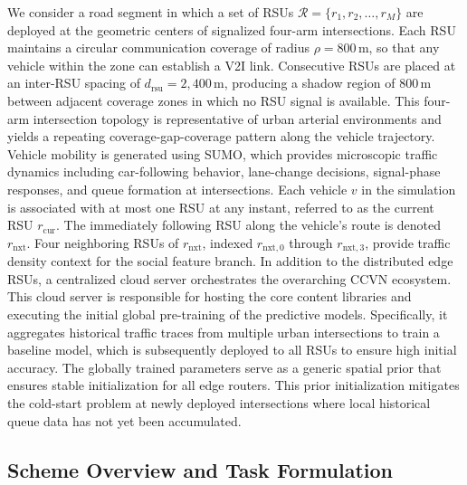 \documentclass[journal]{IEEEtran}
\begin{document}
We consider a road segment in which a set of RSUs $\mathcal{R} = \{r_1, r_2, \ldots, r_M\}$ are deployed at the geometric centers of signalized four-arm intersections.
Each RSU maintains a circular communication coverage of radius $\rho = 800\,\text{m}$, so that any vehicle within the zone can establish a V2I link.
Consecutive RSUs are placed at an inter-RSU spacing of $d_{\text{rsu}} = 2{,}400\,\text{m}$, producing a shadow region of $800\,\text{m}$ between adjacent coverage zones in which no RSU signal is available.
This four-arm intersection topology is representative of urban arterial environments and yields a repeating coverage-gap-coverage pattern along the vehicle trajectory.
Vehicle mobility is generated using SUMO, which provides microscopic traffic dynamics including car-following behavior, lane-change decisions, signal-phase responses, and queue formation at intersections.
Each vehicle $v$ in the simulation is associated with at most one RSU at any instant, referred to as the current RSU $r_{\text{cur}}$. The immediately following RSU along the vehicle's route is denoted $r_{\text{nxt}}$.
Four neighboring RSUs of $r_{\text{nxt}}$, indexed $r_{\text{nxt},0}$ through $r_{\text{nxt},3}$, provide traffic density context for the social feature branch.
In addition to the distributed edge RSUs, a centralized cloud server orchestrates the overarching CCVN ecosystem.
This cloud server is responsible for hosting the core content libraries and executing the initial global pre-training of the predictive models.
Specifically, it aggregates historical traffic traces from multiple urban intersections to train a baseline model, which is subsequently deployed to all RSUs to ensure high initial accuracy. The globally trained parameters serve as a generic spatial prior that ensures stable initialization for all edge routers. This prior initialization mitigates the cold-start problem at newly deployed intersections where local historical queue data has not yet been accumulated.

\subsection{Scheme Overview and Task Formulation}
\label{sec.net.C}
\end{document}
